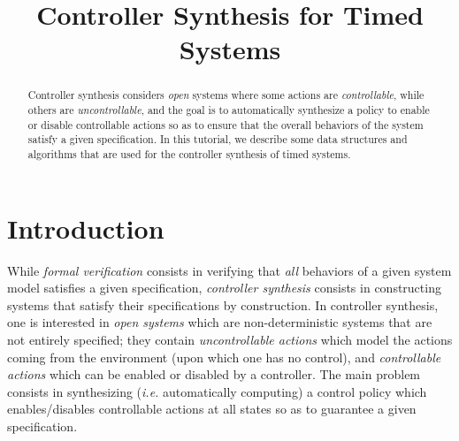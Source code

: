 \documentclass{article}
\begin{document}
\title{Controller Synthesis for Timed Systems}

\def\cpre{\textrm{\sf CPRE}}
\def\post{\textrm{\sf Post}}
\def\predc{\textrm{\sf Pred}_c}
\def\predt{\textrm{\sf Pred}_{\geq 0}}
\def\predu{\textrm{\sf Pred}_u}
\def\calQ{\mathcal{Q}}
\newcommand*\out{\textsf{Outcome}}
\newcommand*\state{\textsf{state}}
\newcommand*\trans{\textsf{trans}}
\newcommand*\TA{\ensuremath{\mathcal{A}}}
\newcommand\runs{\textrm{\sf Runs}}
\newcommand*\Act{\ensuremath{\mathsf{Act}}}
\newcommand*\Locs{\mathcal{L}}
\newcommand*\Realnn{\mathbb{R}_{\geq 0}}
\newcommand*\Clocks{\mathcal{C}}
\newcommand*\Clocksz{\mathcal{C}_0}
\newtheorem{theorem}{Theorem}[section]
\newtheorem{definition}[theorem]{Definition}
\newtheorem{conjecture}[theorem]{Conjecture}
\newtheorem{problem}[theorem]{Problem}
\newtheorem{lemma}[theorem]{Lemma}
\newtheorem{remark}[theorem]{Remark}
\newtheorem{example}[theorem]{Example}
\newtheorem{notation}{Notation}{\bfseries}{\itshape}
\maketitle

\begin{abstract}
  Controller synthesis considers \emph{open} systems where 
  some actions are \emph{controllable}, while others are \emph{uncontrollable},
  and the goal is to automatically synthesize a policy to enable or disable
  controllable actions so as to ensure that the overall behaviors of the system
  satisfy a given specification. In this tutorial, we describe some data structures 
  and algorithms that are used for the controller synthesis of timed systems.
\end{abstract}


\section{Introduction}
While \emph{formal verification} consists in verifying that \emph{all} behaviors of a
given system model satisfies a given specification, \emph{controller synthesis}
consists in constructing systems that satisfy their specifications by
construction.
In controller synthesis, one is interested in \emph{open systems} which are 
non-deterministic systems that are
not entirely specified; they contain \emph{uncontrollable actions} which model
the actions coming from the environment (upon which one has no control), and
\emph{controllable actions} which can be enabled or disabled by a controller.
The main problem consists in synthesizing (\textit{i.e.} automatically
computing) a control policy which enables/disables controllable actions at all
states so as to guarantee a given specification.
\end{document}
